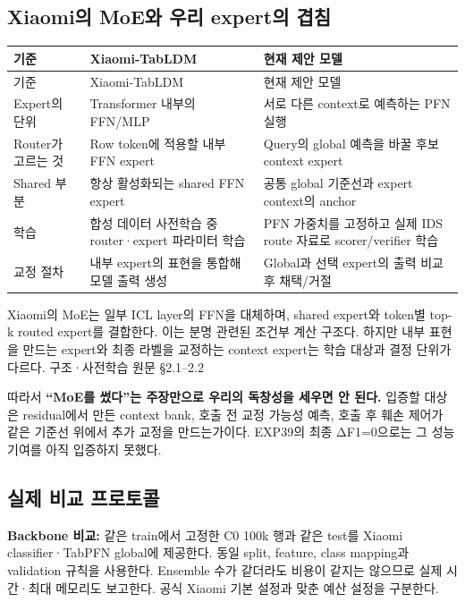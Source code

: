 \subsection{Xiaomi의 MoE와 우리 expert의 겹침}
\begingroup
\footnotesize
\begin{longtable}{>{\raggedright\arraybackslash}p{}>{\raggedright\arraybackslash}p{}>{\raggedright\arraybackslash}p{}}
\toprule
기준 & Xiaomi-TabLDM & 현재 제안 모델 \\ \midrule
\endfirsthead
기준 & Xiaomi-TabLDM & 현재 제안 모델 \\ \midrule
\endhead
{}Expert의 단위 & Transformer 내부의 FFN/\allowbreak{}MLP & 서로 다른 context로 예측하는 PFN 실행 \\
{}Router가 고르는 것 & Row token에 적용할 내부 FFN expert & Query의 global 예측을 바꿀 후보 context expert \\
{}Shared 부분 & 항상 활성화되는 shared FFN expert & 공통 global 기준선과 expert context의 anchor \\
{}학습 & 합성 데이터 사전학습 중 router·expert 파라미터 학습 & PFN 가중치를 고정하고 실제 IDS route 자료로 scorer/\allowbreak{}verifier 학습 \\
{}교정 절차 & 내부 expert의 표현을 통합해 모델 출력 생성 & Global과 선택 expert의 출력 비교 후 채택/\allowbreak{}거절 \\
\bottomrule
\end{longtable}
\endgroup
Xiaomi의 MoE는 일부 ICL layer의 FFN을 대체하며, shared expert와 token별 top-k routed expert를 결합한다. 이는 분명 관련된 조건부 계산 구조다. 하지만 내부 표현을 만드는 expert와 최종 라벨을 교정하는 context expert는 학습 대상과 결정 단위가 다르다. 구조·사전학습 원문 §2.1–2.2

따라서 \textbf{“MoE를 썼다”는 주장만으로 우리의 독창성을 세우면 안 된다.} 입증할 대상은 residual에서 만든 context bank, 호출 전 교정 가능성 예측, 호출 후 훼손 제어가 같은 기준선 위에서 추가 교정을 만드는가이다. EXP39의 최종 ΔF1=\allowbreak{}0으로는 그 성능 기여를 아직 입증하지 못했다.

\subsection{실제 비교 프로토콜}
\par\noindent \textbullet\enspace \textbf{Backbone 비교:} 같은 train에서 고정한 C0 100k 행과 같은 test를 Xiaomi classifier·TabPFN global에 제공한다. 동일 split, feature, class mapping과 validation 규칙을 사용한다. Ensemble 수가 같더라도 비용이 같지는 않으므로 실제 시간·최대 메모리도 보고한다. 공식 Xiaomi 기본 설정과 맞춘 예산 설정을 구분한다.


